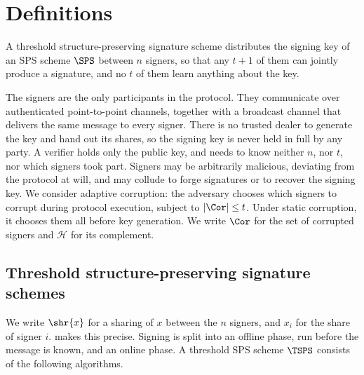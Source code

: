 \section{Definitions}\label{sec:tsps-definitions}

A threshold structure-preserving signature scheme distributes the signing key of
an SPS scheme $\SPS$ between $n$ signers, so that any $t+1$ of them can jointly produce a signature, and no
$t$ of them learn anything about the key.

The signers are the only participants in the protocol. They communicate over
authenticated point-to-point channels, together with a broadcast channel that
delivers the same message to every signer. There is no trusted dealer to
generate the key and hand out its shares, so the signing key is never held in
full by any party. A verifier holds only the public key, and needs to know neither $n$, nor
$t$, nor which signers took part. Signers may be arbitrarily malicious,
deviating from the protocol at will, and may collude to forge signatures or to
recover the signing key. We consider adaptive corruption: the adversary chooses
which signers to corrupt during protocol execution, subject to $|\Cor| \leq t$.
Under static corruption, it chooses them all before key generation. We write
$\Cor$ for the set of corrupted signers and $\mathcal{H}$ for its complement.

\subsection{Threshold structure-preserving signature schemes}

We write $\shr{x}$ for a sharing of $x$ between the $n$ signers, and $x_i$ for
the share of signer $i$.  makes this precise. Signing is split
into an offline phase, run before the message is known, and an online phase. A
threshold SPS scheme $\TSPS$ consists of the following algorithms.

